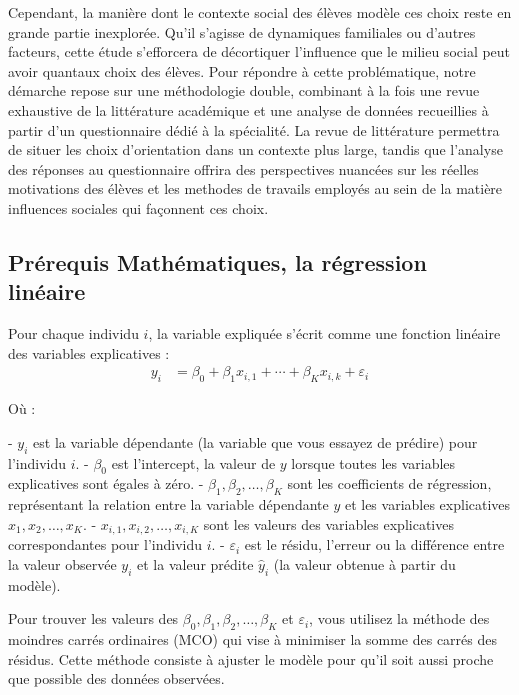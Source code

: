 \documentclass[a4paper, 11pt]{article}
\begin{document}
Cependant, la manière dont le contexte social des élèves modèle ces choix reste en grande partie inexplorée. Qu'il s'agisse de dynamiques familiales ou 
d'autres facteurs, cette étude s'efforcera de décortiquer l'influence que le milieu social peut avoir quantaux choix des élèves. Pour répondre à cette 
problématique, notre démarche repose sur une méthodologie double, combinant à la fois une revue exhaustive de la littérature académique et une 
analyse de données recueillies à partir d'un questionnaire dédié à la spécialité. La revue de littérature permettra de situer les choix d'orientation 
dans un contexte plus large, tandis que l'analyse des réponses au questionnaire offrira des perspectives nuancées sur les réelles motivations
des élèves et les methodes de travails employés au sein de la matière influences sociales qui façonnent ces choix.

\subsection{Prérequis Mathématiques, la régression linéaire}

Pour chaque individu \(i\), la variable expliquée s'écrit comme une fonction linéaire des variables explicatives :
\begin{align}
y_i &= \beta_0 + \beta_1x_{i,1} + \cdots + \beta_Kx_{i,k} + \varepsilon_i
\end{align}

Où :

- \(y_i\) est la variable dépendante (la variable que vous essayez de prédire) pour l'individu \(i\).
- \(\beta_0\) est l'intercept, la valeur de \(y\) lorsque toutes les variables explicatives sont égales à zéro.
- \(\beta_1, \beta_2, \ldots, \beta_K\) sont les coefficients de régression, représentant la relation entre la variable dépendante \(y\) et les variables explicatives \(x_1, x_2, \ldots, x_K\).
- \(x_{i,1}, x_{i,2}, \ldots, x_{i,K}\) sont les valeurs des variables explicatives correspondantes pour l'individu \(i\).
- \(\varepsilon_i\) est le résidu, l'erreur ou la différence entre la valeur observée \(y_i\) et la valeur prédite \(\hat{y}_i\) (la valeur obtenue à partir du modèle).

Pour trouver les valeurs des \(\beta_0, \beta_1, \beta_2, \ldots, \beta_K\) et \(\varepsilon_i\), vous utilisez la méthode des moindres carrés ordinaires (MCO) qui vise à minimiser la somme des carrés des résidus. Cette méthode consiste à ajuster le modèle pour qu'il soit aussi proche que possible des données observées.
\end{document}
